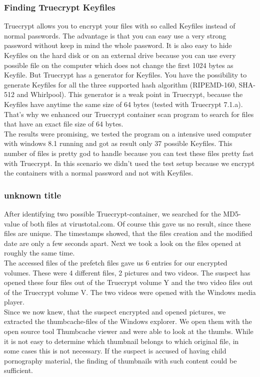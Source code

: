 \subsubsection{Finding Truecrypt Keyfiles}
Truecrypt allows you to encrypt your files with so called Keyfiles instead of normal passwords. The advantage is that you can easy use a very strong password without keep in mind the whole password. It is also easy to hide Keyfiles on the hard disk or on an external drive because you can use every possible file on the computer which does not change the first 1024 bytes as Keyfile. But Truecrypt has a generator for Keyfiles. You have the possibility to generate Keyfiles for all the three supported hash algorithm (RIPEMD-160, SHA-512 and Whirlpool). This generator is a weak point in Truecrypt, because the Keyfiles have anytime the same size of 64 bytes (tested with Truecrypt 7.1.a). That's why we enhanced our Truecrypt container scan program to search for files that have an exact file size of 64 bytes.
\\
The results were promising, we tested the program on a intensive used computer with windows 8.1 running and got as result only 37 possible Keyfiles. This number of files is pretty god to handle because you can test these files pretty fast with Truecrypt. In this scenario we didn't used the test setup because we encrypt the containers with a normal password and not with Keyfiles.
\subsubsection{unknown title}
After identifying two possible Truecrypt-container, we searched for the MD5-value of both files at virustotal.com. Of course this gave us no result, since these files are unique. The timestamps showed, that the files creation and the modified date are only a few seconds apart. Next we took a look on the files opened at roughly the same time. 
\\
The accessed files of the prefetch files gave us 6 entries for our encrypted volumes. These were 4 different files, 2 pictures and two videos.
The suspect has opened these four files out of the Truecrypt volume Y and the two video files out of the Truecrypt volume V. The two videos were opened with the Windows media player.
\\
Since we now knew, that the suspect encrypted and opened pictures, we extracted the thumbcache-files of the Windows explorer. We open them with the open source tool Thumbcache viewer and were able to look at the thumbs. While it is not easy to determine which thumbnail belongs to which original file, in some cases this is not necessary. If the suspect is accused of having child pornography material, the finding of thumbnails with such content could be sufficient.


